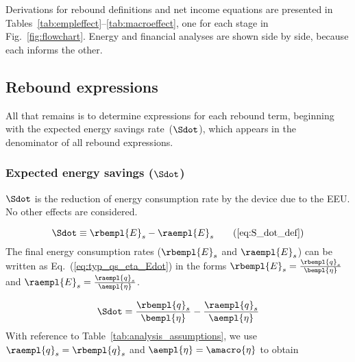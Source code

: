 Derivations for rebound definitions and net income equations
are presented in Tables~\ref{tab:empleffect}--\ref{tab:macroeffect},
one for each stage in Fig.~\ref{fig:flowchart}.
Energy and financial analyses are shown side by side, because
each informs the other.














\subsection{Rebound expressions}
\label{sec:rebound_expressions}

All that remains is to determine expressions for each rebound term, 
beginning with the expected energy savings rate~($\Sdot$), which
appears in the denominator of all rebound expressions.


\subsubsection{Expected energy savings ($\Sdot$)} 
\label{sec:Sdot}

$\Sdot$ is the reduction of energy consumption rate
by the device due to the EEU.
No other effects are considered.

\begin{equation}
  \Sdot \equiv \rbempl{E}_s - \raempl{E}_s  \tag{\ref{eq:S_dot_def}}
\end{equation}
%
The final energy consumption rates ($\rbempl{E}_s$ and $\raempl{E}_s$) 
can be written as Eq.~(\ref{eq:typ_qs_eta_Edot}) in the forms
$\rbempl{E}_s = \frac{\rbempl{q}_s}{\bempl{\eta}}$ and 
$\raempl{E}_s = \frac{\raempl{q}_s}{\aempl{\eta}}$. 

\begin{equation}
  \Sdot = \frac{\rbempl{q}_s}{\bempl{\eta}} - \frac{\raempl{q}_s}{\aempl{\eta}}
\end{equation}
%
With reference to Table~\ref{tab:analysis_assumptions}, 
we use $\raempl{q}_s = \rbempl{q}_s$ and $\aempl{\eta} = \amacro{\eta}$ to obtain

